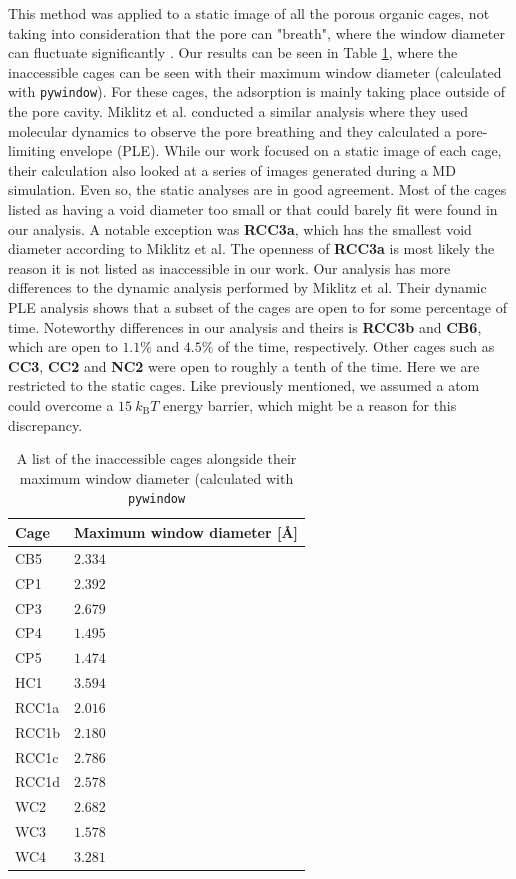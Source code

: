\documentclass[journal=jacsat,manuscript=article]{achemso}
\begin{document}
{This method was applied to a static image of all the porous organic cages, not taking into consideration that the pore can "breath", where the window diameter can fluctuate significantly \cite{miklitz2017computational}. Our results can be seen in Table \ref{tbl:inaccessible}, where the inaccessible cages can be seen with their maximum window diameter (calculated with \texttt{pywindow}). For these cages, the adsorption is mainly taking place outside of the pore cavity. Miklitz et al.\cite{miklitz2017computational} conducted a similar analysis where they used molecular dynamics to observe the pore breathing and they calculated a pore-limiting envelope (PLE). While our work focused on a static image of each cage, their calculation also looked at a series of images generated during a MD simulation.
Even so, the static analyses are in good agreement. Most of the cages listed as having a void diameter too small or that could barely fit  were found in our analysis. A notable exception was \textbf{RCC3a}, which has the smallest void diameter according to Miklitz et al. The openness of \textbf{RCC3a} is most likely the reason it is not listed as inaccessible in our work. Our analysis has more differences to the dynamic analysis performed by Miklitz et al. Their dynamic PLE analysis shows that a subset of the cages are open to  for some percentage of time. Noteworthy differences in our analysis and theirs is \textbf{RCC3b} and \textbf{CB6}, which are open to  $1.1 \%$ and $4.5 \%$ of the time, respectively. Other cages such as \textbf{CC3}, \textbf{CC2} and \textbf{NC2} were open to  roughly a tenth of the time. Here we are restricted to the static cages.
Like previously mentioned, we assumed a  atom could overcome a $15 \ k_\text{B}T$ energy barrier, which might be a reason for this discrepancy.

\begin{table}
  \caption{\color{red}A list of the inaccessible cages alongside their maximum window diameter (calculated with \texttt{pywindow}}
  \label{tbl:inaccessible}
  \begin{tabular}{lp{3.5cm}}
    \hline
    \textbf{Cage}  & \textbf{Maximum window diameter [\AA]}  \\
    \hline
    CB5 & $2.334$ \\
    CP1 & $2.392$ \\
    CP3 & $2.679$ \\
    CP4 & $1.495$ \\
	CP5 & $1.474$ \\
    HC1 & $3.594$ \\
    RCC1a & $2.016$ \\
    RCC1b & $2.180$ \\
    RCC1c & $2.786$ \\
	RCC1d & $2.578$ \\
	WC2 & $2.682$ \\
	WC3 & $1.578$ \\
	WC4 & $3.281$ \\
    \hline
  \end{tabular}
\end{table}


}
\end{document}
